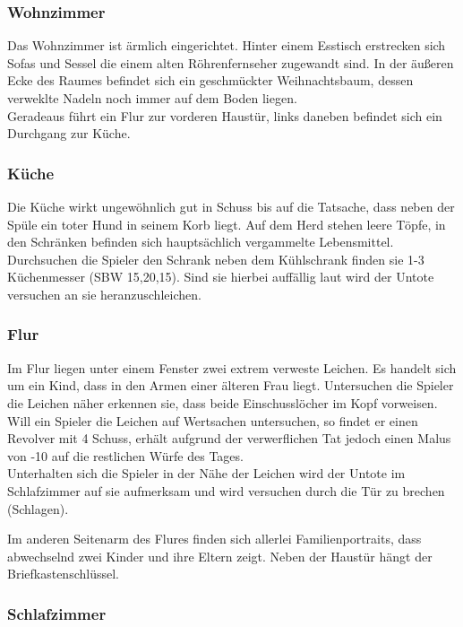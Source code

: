 \documentclass{include/protokollclass}
\begin{document}
\subsubsection{Wohnzimmer}

Das Wohnzimmer ist ärmlich eingerichtet. Hinter einem Esstisch erstrecken sich Sofas und Sessel die einem alten Röhrenfernseher zugewandt sind. In der äußeren Ecke des Raumes befindet sich ein geschmückter Weihnachtsbaum, dessen verweklte Nadeln noch immer auf dem Boden liegen.
\\Geradeaus führt ein Flur zur vorderen Haustür, links daneben  befindet sich ein Durchgang zur Küche.

\subsubsection{Küche}

Die Küche wirkt ungewöhnlich gut in Schuss bis auf die Tatsache, dass neben der Spüle ein toter Hund in seinem Korb liegt. Auf dem Herd stehen leere Töpfe, in den Schränken befinden sich hauptsächlich vergammelte Lebensmittel.
\\Durchsuchen die Spieler den Schrank neben dem Kühlschrank finden sie 1-3 Küchenmesser (SBW 15,20,15). Sind sie hierbei auffällig laut wird der Untote versuchen an sie heranzuschleichen.

\subsubsection{Flur}

Im Flur liegen unter einem Fenster zwei extrem verweste Leichen. Es handelt sich um ein Kind, dass in den Armen einer älteren Frau liegt. Untersuchen die Spieler die Leichen näher erkennen sie, dass beide Einschusslöcher im Kopf vorweisen.
\\Will ein Spieler die Leichen auf Wertsachen untersuchen, so findet er einen Revolver mit 4 Schuss, erhält aufgrund der verwerflichen Tat jedoch einen Malus von -10 auf die restlichen Würfe des Tages.
\\Unterhalten sich die Spieler in der Nähe der Leichen wird der Untote im Schlafzimmer auf sie aufmerksam und wird versuchen durch die Tür zu brechen (Schlagen).

Im anderen Seitenarm des Flures finden sich allerlei Familienportraits, dass abwechselnd zwei Kinder und ihre Eltern zeigt. Neben der Haustür hängt der Briefkastenschlüssel.

\subsubsection{Schlafzimmer}
\end{document}
